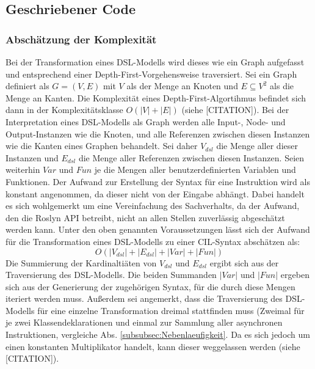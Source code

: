 \subsection{Geschriebener Code}

\subsubsection{Abschätzung der Komplexität}
Bei der Transformation eines DSL-Modells wird dieses wie ein Graph aufgefasst und entsprechend einer Depth-First-Vorgehensweise traversiert. Sei ein Graph definiert als $G = (V, E)$ mit $V$ als der Menge an Knoten und $E \subseteq V^{2}$ als die Menge an Kanten. Die Komplexität eines Depth-First-Algortihmus befindet sich dann in der Komplexitätsklasse $O(\left\vert{V}\right\vert + \left\vert{E}\right\vert)$ (siehe [CITATION]). Bei der Interpretation eines DSL-Modells als Graph werden alle Input-, Node- und Output-Instanzen wie die Knoten, und alle Referenzen zwischen diesen Instanzen wie die Kanten eines Graphen behandelt. Sei daher $V_{dsl}$ die Menge aller dieser Instanzen und $E_{dsl}$ die Menge aller Referenzen zwischen diesen Instanzen. Seien weiterhin $Var$ und $Fun$  je die Mengen aller benutzerdefinierten Variablen und Funktionen. Der Aufwand zur Erstellung der Syntax für eine Instruktion wird als konstant angenommen, da dieser nicht von der Eingabe abhängt. Dabei handelt es sich wohlgemerkt um eine Vereinfachung des Sachverhalts, da der Aufwand, den die Roslyn API betreibt, nicht an allen Stellen zuverlässig abgeschätzt werden kann. 
\newline
Unter den oben genannten Voraussetzungen lässt sich der Aufwand für die Transformation eines DSL-Modells zu einer CIL-Syntax abschätzen als:
$$ O( \left\vert{V_{dsl}}\right\vert + \left\vert{E_{dsl}}\right\vert + \left\vert{Var}\right\vert + \left\vert{Fun}\right\vert ) $$
Die Summierung der Kardinaltiäten von $V_{dsl}$ und $E_{dsl}$ ergibt sich aus der Traversierung des DSL-Modells. Die beiden Summanden $\left\vert{Var}\right\vert$ und $\left\vert{Fun}\right\vert$ ergeben sich aus der Generierung der zugehörigen Syntax, für die durch diese Mengen iteriert werden muss. Außerdem sei angemerkt, dass die Traversierung des DSL-Modells für eine einzelne Transformation dreimal stattfinden muss (Zweimal für je zwei Klassendeklarationen und einmal zur Sammlung aller asynchronen Instruktionen, vergleiche Abs. \ref{subsubsec:Nebenlaeufigkeit}. Da es sich jedoch um einen konstanten Multiplikator handelt, kann dieser weggelassen werden (siehe [CITATION]). 

